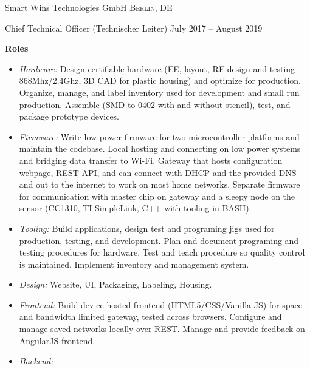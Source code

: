 \headedsection  %
  {\href{http://smartwins.de}{Smart Wins Technologies GmbH}}
  {\textsc{Berlin, DE}} {
  \headedsubsection
    {Chief Technical Officer (Technischer Leiter)}
    {July 2017 -- August 2019}
    {

    \textbf{Roles}
    \begin{itemize}
      \renewcommand\labelitemi{--}
      \item \emph{Hardware:}
        Design certifiable hardware (EE, layout, RF design and testing 868Mhz/2.4Ghz, 3D CAD for plastic housing) and optimize for production. Organize, manage, and label inventory used for development and small run production. Assemble (SMD to 0402 with and without stencil), test, and package prototype devices.
      \item \emph{Firmware:}
        Write low power firmware for two microcontroller platforms and maintain the codebase. Local hosting and connecting on low power systems and bridging data transfer to Wi-Fi. Gateway that hosts configuration webpage, REST API, and can connect with DHCP and the provided DNS and out to the internet to work on most home networks. Separate firmware for communication with master chip on gateway and a sleepy node on the sensor (CC1310, TI SimpleLink, C++ with tooling in BASH).
      \item \emph{Tooling:}
        Build applications, design test and programing jigs used for production, testing, and development. Plan and document programing and testing procedures for hardware. Test and teach procedure so quality control is maintained. Implement inventory and management system.
      \item \emph{Design:}
        Website, UI, Packaging, Labeling, Housing.
      \item \emph{Frontend:}
        Build device hosted frontend (HTML5/CSS/Vanilla JS) for space and bandwidth limited gateway, tested across browsers. Configure and manage saved networks locally over REST. Manage and provide feedback on AngularJS frontend.
      \item \emph{Backend:}

\end{itemize}}}
